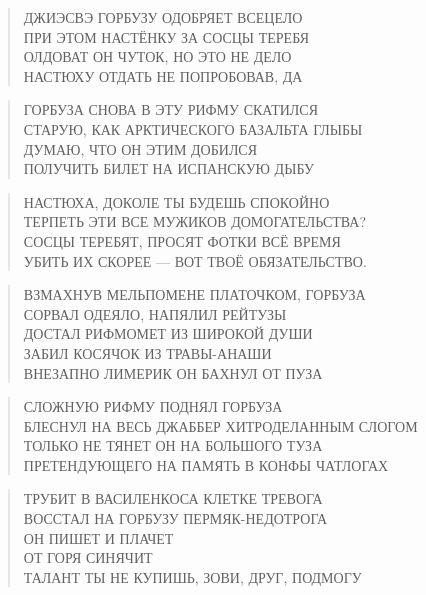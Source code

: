 \poemtitle{***}
\begin{verse}
ДЖИЭСВЭ ГОРБУЗУ ОДОБРЯЕТ ВСЕЦЕЛО\\
ПРИ ЭТОМ НАСТЁНКУ ЗА СОСЦЫ ТЕРЕБЯ\\
ОЛДОВАТ ОН ЧУТОК, НО ЭТО НЕ ДЕЛО\\
НАСТЮХУ ОТДАТЬ НЕ ПОПРОБОВАВ, ДА
\end{verse}

\poemtitle{***}
\begin{verse}
ГОРБУЗА СНОВА В ЭТУ РИФМУ СКАТИЛСЯ\\
СТАРУЮ, КАК АРКТИЧЕСКОГО БАЗАЛЬТА ГЛЫБЫ\\
ДУМАЮ, ЧТО ОН ЭТИМ ДОБИЛСЯ\\
ПОЛУЧИТЬ БИЛЕТ НА ИСПАНСКУЮ ДЫБУ
\end{verse}

\poemtitle{***}
\begin{verse}
НАСТЮХА, ДОКОЛЕ ТЫ БУДЕШЬ СПОКОЙНО\\
ТЕРПЕТЬ ЭТИ ВСЕ МУЖИКОВ ДОМОГАТЕЛЬСТВА?\\
СОСЦЫ ТЕРЕБЯТ, ПРОСЯТ ФОТКИ ВСЁ ВРЕМЯ\\
УБИТЬ ИХ СКОРЕЕ — ВОТ ТВОЁ ОБЯЗАТЕЛЬСТВО.
\end{verse}

\poemtitle{***}
\begin{verse}
ВЗМАХНУВ МЕЛЬПОМЕНЕ ПЛАТОЧКОМ, ГОРБУЗА\\
СОРВАЛ ОДЕЯЛО, НАПЯЛИЛ РЕЙТУЗЫ\\
ДОСТАЛ РИФМОМЕТ ИЗ ШИРОКОЙ ДУШИ\\
ЗАБИЛ КОСЯЧОК ИЗ ТРАВЫ-АНАШИ\\
ВНЕЗАПНО ЛИМЕРИК ОН БАХНУЛ ОТ ПУЗА
\end{verse}

\poemtitle{***}
\begin{verse}
СЛОЖНУЮ РИФМУ ПОДНЯЛ ГОРБУЗА\\
БЛЕСНУЛ НА ВЕСЬ ДЖАББЕР ХИТРОДЕЛАННЫМ СЛОГОМ\\
ТОЛЬКО НЕ ТЯНЕТ ОН НА БОЛЬШОГО ТУЗА\\
ПРЕТЕНДУЮЩЕГО НА ПАМЯТЬ В КОНФЫ ЧАТЛОГАХ
\end{verse}

\poemtitle{***}
\begin{verse}
ТРУБИТ В ВАСИЛЕНКОСА КЛЕТКЕ ТРЕВОГА\\
ВОССТАЛ НА ГОРБУЗУ ПЕРМЯК-НЕДОТРОГА\\
ОН ПИШЕТ И ПЛАЧЕТ\\
ОТ ГОРЯ СИНЯЧИТ\\
ТАЛАНТ ТЫ НЕ КУПИШЬ, ЗОВИ, ДРУГ, ПОДМОГУ
\end{verse}

